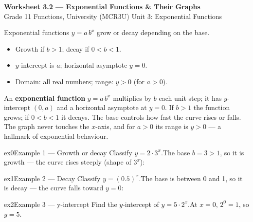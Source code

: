 \documentclass[11pt]{article}
\begin{document}
\begin{center}
{\LARGE\bfseries\color{titleblue}Worksheet 3.2 --- Exponential Functions \& Their Graphs}\\[2pt]
{\small Grade 11 Functions, University (MCR3U) \textperiodcentered{} Unit 3: Exponential Functions}
\end{center}

\begin{ideabox}
Exponential functions $y=a\,b^{x}$ grow or decay depending on the base.
\begin{itemize}[leftmargin=*,itemsep=2pt]
  \item Growth if $b>1$; decay if $0<b<1$.
  \item $y$-intercept is $a$; horizontal asymptote $y=0$.
  \item Domain: all real numbers; range: $y>0$ (for $a>0$).
\end{itemize}
\end{ideabox}

\begin{learnbox}
An \textbf{exponential function} $y=a\,b^x$ multiplies by $b$ each unit step; it has $y$-intercept $(0,a)$ and a horizontal asymptote at $y=0$.
If $b>1$ the function grows; if $0<b<1$ it decays. The base controls how fast the curve rises or falls.
The graph never touches the $x$-axis, and for $a>0$ its range is $y>0$ — a hallmark of exponential behaviour.
\end{learnbox}


\begin{example}{ex0}{Example 1 --- Growth or decay}
Classify $y=2\cdot3^{x}$.\soln The base $b=3>1$, so it is growth — the curve rises steeply (shape of $3^x$):
\end{example}

\begin{example}{ex1}{Example 2 --- Decay}
Classify $y=(0.5)^{x}$.\soln The base is between 0 and 1, so it is decay — the curve falls toward $y=0$:
\end{example}

\begin{example}{ex2}{Example 3 --- y-intercept}
Find the $y$-intercept of $y=5\cdot2^{x}$.\soln At $x=0$, $2^0=1$, so $y=5$.
\end{example}
\end{document}
